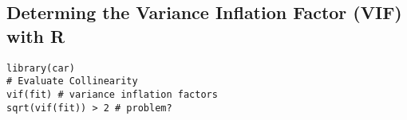 \documentclass[a4paper,12pt]{article}
\begin{document}
\newpage
\subsection{Determing the Variance Inflation Factor (VIF) with R}
\begin{verbatim}
library(car)
# Evaluate Collinearity
vif(fit) # variance inflation factors
sqrt(vif(fit)) > 2 # problem?
\end{verbatim}
%
%


%
%
%
%
%
\end{document}
